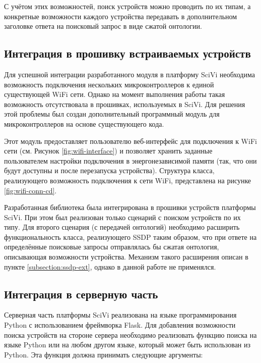 С учётом этих возможностей, поиск устройств можно проводить по их типам, а конкретные возможности каждого устройства передавать в дополнительном заголовке ответа на поисковый запрос в виде сжатой онтологии.

\subsection{Интеграция в прошивку встраиваемых устройств}

Для успешной интеграции разработанного модуля в платформу SciVi необходима возможность подключения нескольких микроконтроллеров к единой существующей WiFi сети.
Однако на момент выполнения работы такая возможность отсутствовала в прошивках, используемых в SciVi.
Для решения этой проблемы был создан дополнительный программный модуль для микроконтроллеров на основе существующего кода.

Этот модуль предоставляет пользователю веб-интерфейс для подключения к WiFi сети (см.
Рисунок \ref{fig:wifi-interface}) и позволяет хранить заданные пользователем настройки подключения в энергонезависимой памяти (так, что они будут доступны и после перезапуска устройства).
Структура класса, реализующего возможность подключения к сети WiFi, представлена на рисунке \ref{fig:wifi-conn-cd}.



Разработанная библиотека была интегрирована в прошивки устройств платформы SciVi.
При этом был реализован только сценарий с поиском устройств по их типу.
Для второго сценария (с передачей онтологий) необходимо расширить функциональность класса, реализующего SSDP таким образом, что при ответе на определённые поисковые запросы отправлялась бы сжатая онтология, описывающая возможности устройства.
Механизм такого расширения описан в пункте \ref{subsection:ssdp-ext}, однако в данной работе не применялся.

\subsection{Интеграция в серверную часть}

Серверная часть платформы SciVi реализована на языке программирования Python с использованием фреймворка Flask.
Для добавления возможности поиска устройств на стороне сервера необходимо реализовать функцию поиска на языке Python или на любом другом языке, который может быть использован из Python.
Эта функция должна принимать следующие аргументы:

